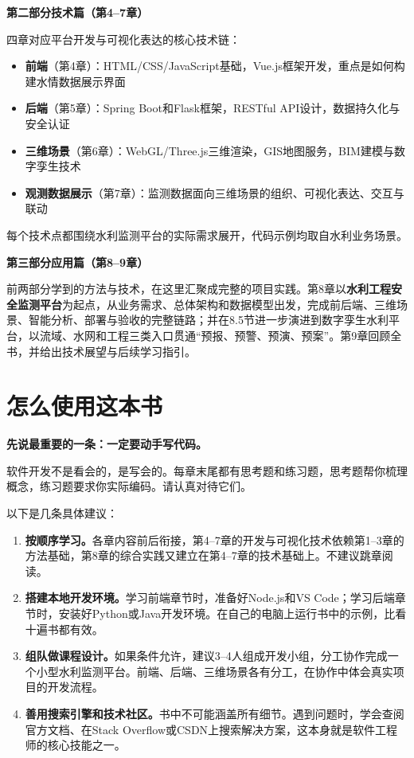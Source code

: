 \begin{tipbox}
\textbf{第二部分\quad 技术篇（第4--7章）}

四章对应平台开发与可视化表达的核心技术链：
\begin{itemize}
\item \textbf{前端}（第4章）：HTML/CSS/JavaScript基础，Vue.js框架开发，重点是如何构建水情数据展示界面
\item \textbf{后端}（第5章）：Spring Boot和Flask框架，RESTful API设计，数据持久化与安全认证
\item \textbf{三维场景}（第6章）：WebGL/Three.js三维渲染，GIS地图服务，BIM建模与数字孪生技术
\item \textbf{观测数据展示}（第7章）：监测数据面向三维场景的组织、可视化表达、交互与联动
\end{itemize}
每个技术点都围绕水利监测平台的实际需求展开，代码示例均取自水利业务场景。
\end{tipbox}

\begin{notebox}
\textbf{第三部分\quad 应用篇（第8--9章）}

前两部分学到的方法与技术，在这里汇聚成完整的项目实践。第8章以\textbf{水利工程安全监测平台}为起点，从业务需求、总体架构和数据模型出发，完成前后端、三维场景、智能分析、部署与验收的完整链路；并在8.5节进一步演进到数字孪生水利平台，以流域、水网和工程三类入口贯通“预报、预警、预演、预案”。第9章回顾全书，并给出技术展望与后续学习指引。
\end{notebox}

\section*{怎么使用这本书}

\textbf{先说最重要的一条：一定要动手写代码。}

软件开发不是看会的，是写会的。每章末尾都有思考题和练习题，思考题帮你梳理概念，练习题要求你实际编码。请认真对待它们。

以下是几条具体建议：

\begin{enumerate}
\item \textbf{按顺序学习。}各章内容前后衔接，第4--7章的开发与可视化技术依赖第1--3章的方法基础，第8章的综合实践又建立在第4--7章的技术基础上。不建议跳章阅读。

\item \textbf{搭建本地开发环境。}学习前端章节时，准备好Node.js和VS Code；学习后端章节时，安装好Python或Java开发环境。在自己的电脑上运行书中的示例，比看十遍书都有效。

\item \textbf{组队做课程设计。}如果条件允许，建议3--4人组成开发小组，分工协作完成一个小型水利监测平台。前端、后端、三维场景各有分工，在协作中体会真实项目的开发流程。

\item \textbf{善用搜索引擎和技术社区。}书中不可能涵盖所有细节。遇到问题时，学会查阅官方文档、在Stack Overflow或CSDN上搜索解决方案，这本身就是软件工程师的核心技能之一。
\end{enumerate}

